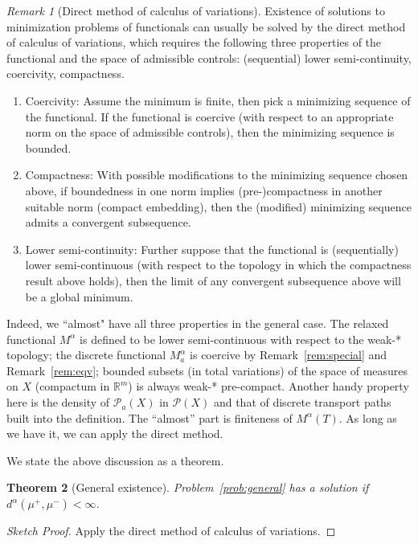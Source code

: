 \documentclass[fleqn]{article}
\newtheorem{thm}{Theorem}[section]
\theoremstyle{definition}
\theoremstyle{remark}
\newtheorem{rem}[thm]{Remark}
\renewcommand{\P}{\mathcal{P}} %
\begin{document}
\par
\begin{rem}[Direct method of calculus of variations]\label{rem:calcvar}
Existence of solutions to minimization problems of functionals can usually be solved by the direct method of calculus of variations, which requires the following three properties of the functional and the space of admissible controls: (sequential) lower semi-continuity, coercivity, compactness.
\begin{enumerate}
	\item Coercivity: Assume the minimum is finite, then pick a minimizing sequence of the functional. If the functional is coercive (with respect to an appropriate norm on the space of admissible controls), then the minimizing sequence is bounded.
	\item Compactness: With possible modifications to the minimizing sequence chosen above, if boundedness in one norm implies (pre-)compactness in another suitable norm (compact embedding), then the (modified) minimizing sequence admits a convergent subsequence.
	\item Lower semi-continuity: Further suppose that the functional is (sequentially) lower semi-continuous (with respect to the topology in which the compactness result above holds), then the limit of any convergent subsequence above will be a global minimum.
\end{enumerate}
Indeed, we ``almost" have all three properties in the general case. The relaxed functional $M^\alpha$ is defined to be lower semi-continuous with respect to the weak-* topology; the discrete functional $M_a^\alpha$ is coercive by Remark~\ref{rem:special} and Remark~\ref{rem:eqv}; bounded subsets (in total variations) of the space of measures on $X$ (compactum in $\mathbb{R}^m$) is always weak-* pre-compact. Another handy property here is the density of $\P_a(X)$ in $\P(X)$ and that of discrete transport paths built into the definition. The ``almost'' part is finiteness of $M^\alpha(T)$. As long as we have it, we can apply the direct method.
\end{rem}

\par
We state the above discussion as a theorem.
\begin{thm}[General existence]\label{thm:generalexist}
Problem~\ref{prob:general} has a solution if $d^\alpha(\mu^+,\mu^-)<\infty$.
\end{thm}

\begin{proof}[Sketch Proof]
Apply the direct method of calculus of variations.
\end{proof}
\end{document}
